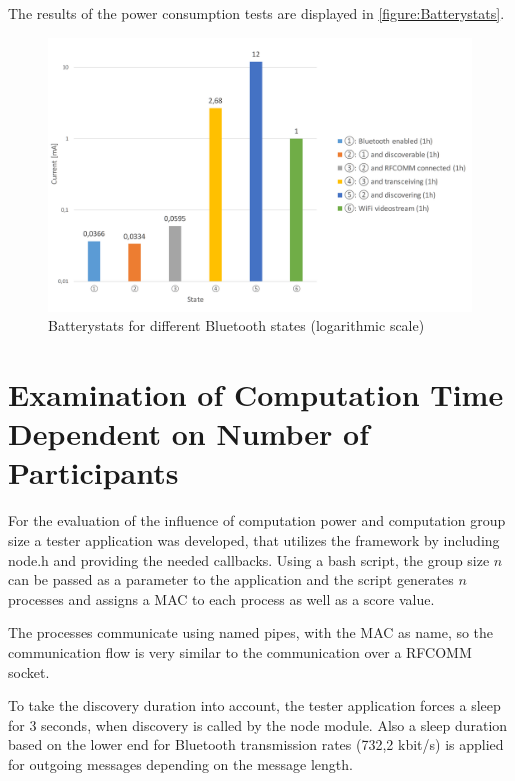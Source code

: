 The results of the power consumption tests are displayed in \autoref{figure:Batterystats}.

\begin{figure}[!htbp] %
	\caption{Batterystats for different Bluetooth states (logarithmic scale) } \label{figure:Batterystats}
	\includegraphics[scale=1.0]{figures/eval_current_measurements.png}
\end{figure}

\section{Examination of Computation Time Dependent on Number of Participants} \label{Examination of Computation Time Dependent on Number of Participants}

For the evaluation of the influence of computation power and computation group size a tester application was developed, that utilizes the framework by including node.h and providing the needed callbacks. Using a bash script, the group size $n$ can be passed as a parameter to the application and the script generates $n$ processes and assigns a \gls{MAC} to each process as well as a score value.

The processes communicate using named pipes, with the \gls{MAC} as name, so the communication flow is very similar to the communication over a \gls{RFCOMM} socket.

To take the discovery duration into account, the tester application forces a sleep for 3 seconds, when discovery is called by the node module. Also a sleep duration based on the lower end for Bluetooth transmission rates (732,2 kbit/s) is applied for outgoing messages depending on the message length.


